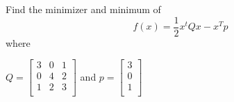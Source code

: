 \begin{problem}
Find the minimizer and minimum of 
\begin{equation}
f(x) = \frac{1}{2}x^tQx - x^Tp
\end{equation}
where 

\begin{center}
$Q =
\begin{bmatrix}
3 & 0 & 1\\
0 & 4 & 2\\
1 & 2 & 3\\
\end{bmatrix}
$
and $p = 
\begin{bmatrix}
3\\
0\\
1\\
\end{bmatrix}
$
\end{center}
\end{problem}